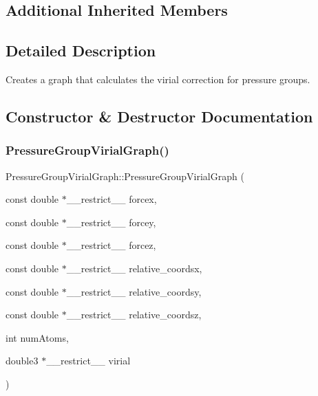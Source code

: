 \subsection*{Additional Inherited Members}


\subsection{Detailed Description}
Creates a graph that calculates the virial correction for pressure groups. 

\subsection{Constructor \& Destructor Documentation}
\hypertarget{classPressureGroupVirialGraph_ae7ff1b34d814a6c977a50430167f4304}{}\label{classPressureGroupVirialGraph_ae7ff1b34d814a6c977a50430167f4304} 
\subsubsection{\texorpdfstring{Pressure\+Group\+Virial\+Graph()}{PressureGroupVirialGraph()}\hspace{0.1cm}{\footnotesize\ttfamily [1/2]}}
{\footnotesize\ttfamily Pressure\+Group\+Virial\+Graph\+::\+Pressure\+Group\+Virial\+Graph (\begin{DoxyParamCaption}\item[{const double $\ast$\+\_\+\+\_\+restrict\+\_\+\+\_\+}]{forcex,  }\item[{const double $\ast$\+\_\+\+\_\+restrict\+\_\+\+\_\+}]{forcey,  }\item[{const double $\ast$\+\_\+\+\_\+restrict\+\_\+\+\_\+}]{forcez,  }\item[{const double $\ast$\+\_\+\+\_\+restrict\+\_\+\+\_\+}]{relative\+\_\+coordsx,  }\item[{const double $\ast$\+\_\+\+\_\+restrict\+\_\+\+\_\+}]{relative\+\_\+coordsy,  }\item[{const double $\ast$\+\_\+\+\_\+restrict\+\_\+\+\_\+}]{relative\+\_\+coordsz,  }\item[{int}]{num\+Atoms,  }\item[{double3 $\ast$\+\_\+\+\_\+restrict\+\_\+\+\_\+}]{virial }\end{DoxyParamCaption})}




